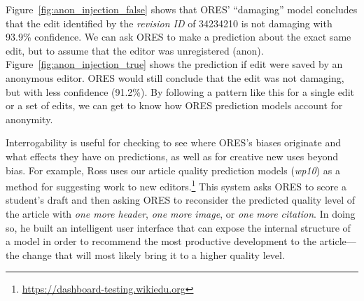 Figure~\ref{fig:anon_injection_false} shows that ORES' ``damaging'' model concludes that the edit identified by the \emph{revision ID} of 34234210 is not damaging with 93.9\% confidence.  We can ask ORES to make a prediction about the exact same edit, but to assume that the editor was unregistered (anon). Figure~\ref{fig:anon_injection_true} shows the prediction if edit were saved by an anonymous editor.  ORES would still conclude that the edit was not damaging, but with less confidence (91.2\%).  By following a pattern like this for a single edit or a set of edits, we can get to know how ORES prediction models account for anonymity.

Interrogability is useful for checking to see where ORES's biases originate and what effects they have on predictions, as well as for creative new uses beyond bias.  For example, Ross uses our article quality prediction models (\emph{wp10}) as a method for suggesting work to new editors.\footnote{\url{https://dashboard-testing.wikiedu.org}}  This system asks ORES to score a student's draft and then asking ORES to reconsider the predicted quality level of the article with \emph{one more header}, \emph{one more image}, or \emph{one more citation}. In doing so, he built an intelligent user interface that can expose the internal structure of a model in order to recommend the most productive development to the article---the change that will most likely bring it to a higher quality level.
